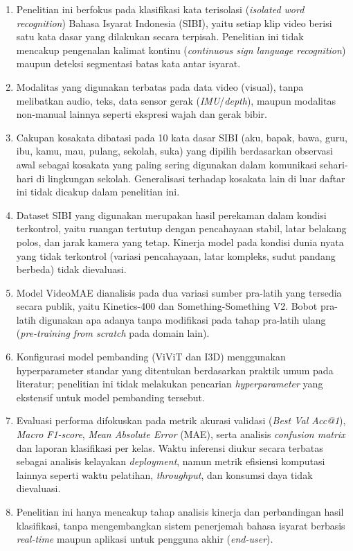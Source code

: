 \begin{enumerate}
    \item Penelitian ini berfokus pada klasifikasi kata terisolasi (\textit{isolated word recognition}) Bahasa Isyarat Indonesia (SIBI), yaitu setiap klip video berisi satu kata dasar yang dilakukan secara terpisah. Penelitian ini tidak mencakup pengenalan kalimat kontinu (\textit{continuous sign language recognition}) maupun deteksi segmentasi batas kata antar isyarat.

    \item Modalitas yang digunakan terbatas pada data video (visual), tanpa melibatkan audio, teks, data sensor gerak (\textit{IMU}/\textit{depth}), maupun modalitas non-manual lainnya seperti ekspresi wajah dan gerak bibir.

    \item Cakupan kosakata dibatasi pada 10 kata dasar SIBI (aku, bapak, bawa, guru, ibu, kamu, mau, pulang, sekolah, suka) yang dipilih berdasarkan observasi awal sebagai kosakata yang paling sering digunakan dalam komunikasi sehari-hari di lingkungan sekolah. Generalisasi terhadap kosakata lain di luar daftar ini tidak dicakup dalam penelitian ini.

    \item Dataset SIBI yang digunakan merupakan hasil perekaman dalam kondisi terkontrol, yaitu ruangan tertutup dengan pencahayaan stabil, latar belakang polos, dan jarak kamera yang tetap. Kinerja model pada kondisi dunia nyata yang tidak terkontrol (variasi pencahayaan, latar kompleks, sudut pandang berbeda) tidak dievaluasi.

    \item Model VideoMAE dianalisis pada dua variasi sumber pra-latih yang tersedia secara publik, yaitu Kinetics-400 dan Something-Something V2. Bobot pra-latih digunakan apa adanya tanpa modifikasi pada tahap pra-latih ulang (\textit{pre-training from scratch} pada domain lain).

    \item Konfigurasi model pembanding (ViViT dan I3D) menggunakan hyperparameter standar yang ditentukan berdasarkan praktik umum pada literatur; penelitian ini tidak melakukan pencarian \textit{hyperparameter} yang ekstensif untuk model pembanding tersebut.

    \item Evaluasi performa difokuskan pada metrik akurasi validasi (\textit{Best Val Acc@1}), \textit{Macro F1-score}, \textit{Mean Absolute Error} (MAE), serta analisis \textit{confusion matrix} dan laporan klasifikasi per kelas. Waktu inferensi diukur secara terbatas sebagai analisis kelayakan \textit{deployment}, namun metrik efisiensi komputasi lainnya seperti waktu pelatihan, \textit{throughput}, dan konsumsi daya tidak dievaluasi.

    \item Penelitian ini hanya mencakup tahap analisis kinerja dan perbandingan hasil klasifikasi, tanpa mengembangkan sistem penerjemah bahasa isyarat berbasis \textit{real-time} maupun aplikasi untuk pengguna akhir (\textit{end-user}).
\end{enumerate}

